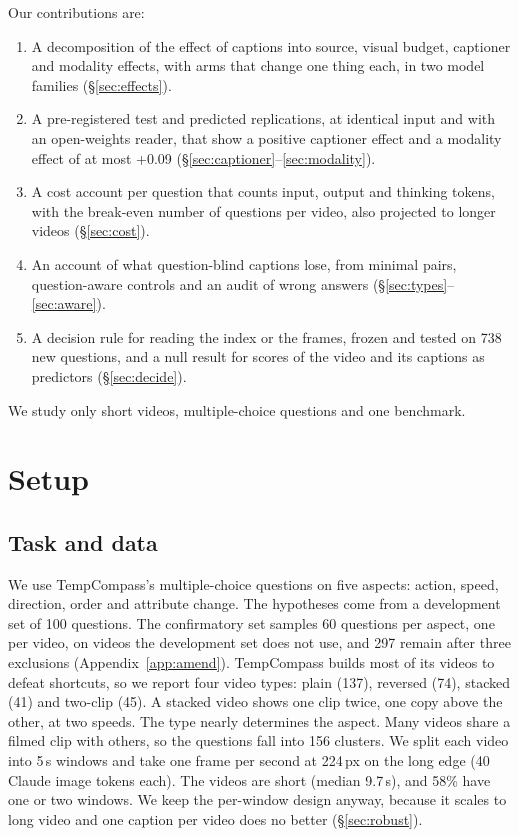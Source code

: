 \documentclass[11pt]{article}
\begin{document}
Our contributions are:
\begin{enumerate}
\item A decomposition of the effect of captions into source, visual budget, captioner and modality effects, with arms that change one thing each, in two model families (\S\ref{sec:effects}).
\item A pre-registered test and predicted replications, at identical input and with an open-weights reader, that show a positive captioner effect and a modality effect of at most +0.09 (\S\ref{sec:captioner}--\ref{sec:modality}).
\item A cost account per question that counts input, output and thinking tokens, with the break-even number of questions per video, also projected to longer videos (\S\ref{sec:cost}).
\item An account of what question-blind captions lose, from minimal pairs, question-aware controls and an audit of wrong answers (\S\ref{sec:types}--\ref{sec:aware}).
\item A decision rule for reading the index or the frames, frozen and tested on 738 new questions, and a null result for scores of the video and its captions as predictors (\S\ref{sec:decide}).
\end{enumerate}
We study only short videos, multiple-choice questions and one benchmark.

\section{Setup}

\subsection{Task and data}
\label{sec:data}
We use TempCompass's multiple-choice questions \citep{tempcompass} on five aspects: action, speed, direction, order and attribute change. The hypotheses come from a development set of 100 questions. The confirmatory set samples 60 questions per aspect, one per video, on videos the development set does not use, and 297 remain after three exclusions (Appendix~\ref{app:amend}). TempCompass builds most of its videos to defeat shortcuts, so we report four video types: plain (137), reversed (74), stacked (41) and two-clip (45). A stacked video shows one clip twice, one copy above the other, at two speeds. The type nearly determines the aspect. Many videos share a filmed clip with others, so the questions fall into 156 clusters. We split each video into 5\,s windows and take one frame per second at 224\,px on the long edge (40 Claude image tokens each). The videos are short (median 9.7\,s), and 58\% have one or two windows. We keep the per-window design anyway, because it scales to long video and one caption per video does no better (\S\ref{sec:robust}).
\end{document}
